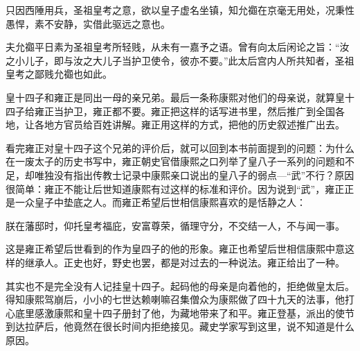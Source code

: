 
\begin{bookquote}只因西陲用兵，圣祖皇考之意，欲以皇子虚名坐镇，知允禵在京毫无用处，况秉性愚悍，素不安静，实借此驱远之意也。\end{bookquote}


\begin{bookquote}夫允禵平日素为圣祖皇考所轻贱，从未有一嘉予之语。曾有向太后闲论之旨：“汝之小儿子，即与汝之大儿子当护卫使令，彼亦不要。”此太后宫内人所共知者，圣祖皇考之鄙贱允禵也如此。\end{bookquote}


皇十四子和雍正是同出一母的亲兄弟。最后一条称康熙对他们的母亲说，就算皇十四子给雍正当护卫，雍正都不要。雍正把这样的话写进书里，然后推广到全国各地，让各地方官员给百姓讲解。雍正用这样的方式，把他的历史叙述推广出去。



看完雍正对皇十四子这个兄弟的评价后，就可以回到本书前面提到的问题：为什么在一废太子的历史书写中，雍正朝史官借康熙之口列举了皇八子一系列的问题和不足，却唯独没有指出传教士记录中康熙亲口说出的皇八子的弱点—“武”不行？原因很简单：雍正不能让后世知道康熙有过这样的标准和评价。因为说到“武”，雍正正是一众皇子中垫底之人。而雍正希望后世相信康熙喜欢的是恬静之人：



\begin{bookquote}朕在藩邸时，仰托皇考福庇，安富尊荣，循理守分，不交结一人，不与闻一事。\end{bookquote}


这是雍正希望后世看到的作为皇四子的他的形象。雍正也希望后世相信康熙中意这样的继承人。正史也好，野史也罢，都是对过去的一种说法。雍正给出了一种。



其实也不是完全没有人记挂皇十四子。起码他的母亲是向着他的，拒绝做皇太后。得知康熙驾崩后，小小的七世达赖喇嘛召集僧众为康熙做了四十九天的法事，他打心底里感激康熙和皇十四子册封了他，为藏地带来了和平。雍正登基，派出的使节到达拉萨后，他竟然在很长时间内拒绝接见。藏史学家写到这里，说不知道是什么原因。


